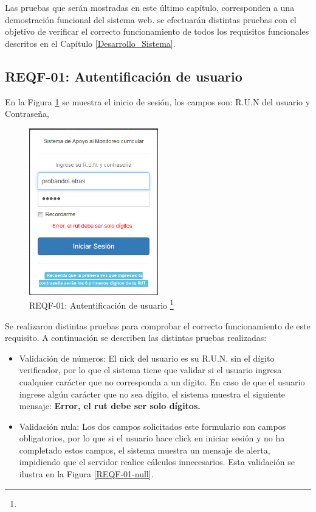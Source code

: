 Las pruebas que serán mostradas en este último capítulo, corresponden a una demostración funcional del sistema web.
se efectuarán distintas pruebas con el objetivo de verificar  el correcto funcionamiento de todos los requisitos funcionales descritos en el Capítulo \ref{Desarrollo_Sistema}.
\subsection{REQF-01: Autentificación de usuario}


En la Figura \ref{REQF-01} se muestra el inicio de sesión, los campos son: R.U.N del usuario y
Contraseña,


	\begin{figure}[H]
		\centering
		\includegraphics[width=0.5\textwidth]{images/Capitulo_5/REQF-01.png}
		\caption[REQF-01: Autentificación de usuario]{REQF-01: Autentificación de usuario \footnote{}}
		\label{REQF-01}
	\end{figure}
	
	
	Se realizaron distintas pruebas para comprobar el correcto funcionamiento de este requisito. A continuación se describen las distintas pruebas realizadas:
	\begin{itemize}
		\item Validación de números: El nick del usuario es su R.U.N. sin el dígito verificador, por lo que el sistema tiene que validar si el usuario ingresa cualquier carácter que no corresponda a un dígito. En caso de que el usuario ingrese algún carácter que no sea dígito, el sistema muestra el siguiente mensaje: \textbf{Error, el rut debe ser solo dígitos.}
		
		\item Validación nula: Los  dos campos solicitados  este formulario son campos obligatorios, por lo que si el usuario hace click en iniciar sesión y no ha completado estos campos, el sistema muestra un mensaje de alerta, impidiendo que el servidor realice cálculos innecesarios. Esta validación se ilustra en la Figura \ref{REQF-01-null}.
	\end{itemize}
	

